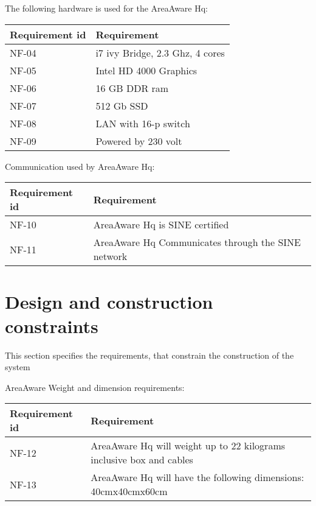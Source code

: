The following hardware is used for the AreaAware Hq:
\begin{longtable}{| p{3.2cm} |  p{10cm} | }
	\hline
	\textbf{Requirement id} &  \textbf{Requirement } \\
	\hline
	NF-04 & i7 ivy Bridge, 2.3 Ghz, 4 cores  \\
	\hline
	NF-05 & Intel HD 4000 Graphics  \\
	\hline
	NF-06 & 16 GB DDR ram  \\
	\hline
	NF-07 &512 Gb SSD \\
	\hline
	NF-08 & LAN with 16-p switch  \\
	\hline
	NF-09 & Powered by 230 volt \\
	\hline
\end{longtable}

Communication used by AreaAware Hq:
\begin{longtable}{| p{3.2cm} |  p{10cm} | }
	\hline
	\textbf{Requirement id} &  \textbf{Requirement } \\
	\hline
	NF-10 & AreaAware Hq is SINE certified  \\
	\hline
	NF-11 & AreaAware Hq Communicates through the SINE network \\
	\hline
\end{longtable}





\section{Design and construction constraints}
This section specifies the requirements, that constrain the construction of the system

AreaAware Weight and dimension requirements:
\begin{longtable}{| p{3.2cm} |  p{10cm} | }
	\hline
	\textbf{Requirement id} &  \textbf{Requirement } \\
	\hline
	NF-12 & AreaAware Hq will weight up to 22 kilograms inclusive box and cables  \\
	\hline
	NF-13 & AreaAware Hq will have the following dimensions: 40cmx40cmx60cm \\
	\hline
\end{longtable}


